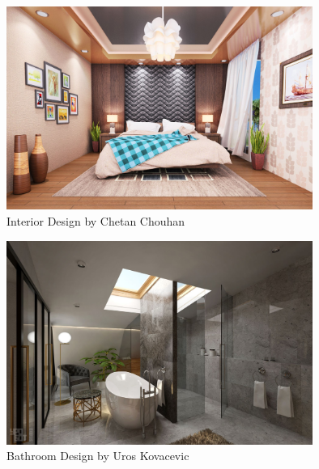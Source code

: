\begin{figure}
	\centering
		\includegraphics[width=10cm]{img/bedroom.jpg}
	\caption{Interior Design by Chetan Chouhan}
	\label{fig:5}
\end{figure}



\begin{figure}
	\centering
		\includegraphics[width=10cm]{img/bath2.jpg}
	\caption{Bathroom Design by Uros Kovacevic}
	\label{fig:6}
\end{figure}






